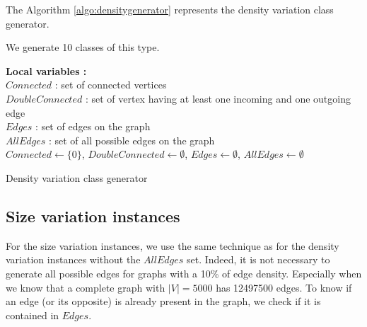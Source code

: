 The Algorithm \ref{algo:densitygenerator} represents the density variation class generator.

We generate 10 classes of this type.


\begin{algorithm}
 \textbf{Local variables :} \\
 $Connected$ : set of connected vertices \\
 $DoubleConnected$ : set of vertex having at least one incoming and one outgoing edge \\
 $Edges$ : set of edges on the graph \\
 $AllEdges$ : set of all possible edges on the graph\\
 $Connected \gets \{0\}$, $DoubleConnected\gets \emptyset$, $Edges\gets \emptyset$, $AllEdges\gets \emptyset$\;
 



 \caption{Density variation class generator}
 \label{algo:densitygenerator}
\end{algorithm}

\subsection{Size variation instances}
For the size variation instances, we use the same technique as for the density variation instances without the $AllEdges$ set. Indeed, it is not necessary to generate all possible edges for graphs with a 10\% of edge density. Especially when we know that a complete graph with $|V|=5000$ has 12497500 edges. To know if an edge (or its opposite) is already present in the graph, we check if it is contained in $Edges$.

